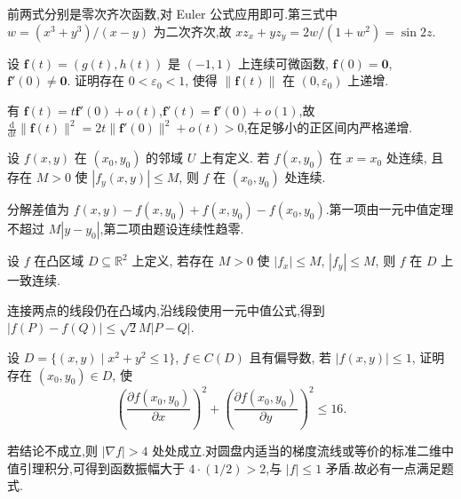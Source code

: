 \begin{solution}
    前两式分别是零次齐次函数,对 Euler 公式应用即可.第三式中 $w=(x^3+y^3)/(x-y)$ 为二次齐次,故 $xz_x+yz_y=2w/(1+w^2)=\sin2z$.
\end{solution}

\begin{example}
    设 $\bm f(t)=(g(t),h(t))$ 是 $(-1,1)$ 上连续可微函数, $\bm f(0)=\bm{0}$, $\bm f'(0)\ne\bm{0}$. 证明存在 $0<\varepsilon_0<1$, 使得 $\|\bm f(t)\|$ 在 $(0,\varepsilon_0)$ 上递增.
\end{example}
\exampleblank

\begin{solution}
    有 $\bm f(t)=t\bm f'(0)+o(t)$,$\bm f'(t)=\bm f'(0)+o(1)$,故
    $\frac{\mathrm d}{\mathrm dt}\|\bm f(t)\|^2=2t\|\bm f'(0)\|^2+o(t)>0$,在足够小的正区间内严格递增.
\end{solution}

\begin{example}
    设 $f(x,y)$ 在 $(x_0,y_0)$ 的邻域 $U$ 上有定义. 若 $f(x,y_0)$ 在 $x=x_0$ 处连续, 且存在 $M>0$ 使 $|f_y(x,y)|\leq M$, 则 $f$ 在 $(x_0,y_0)$ 处连续.
\end{example}
\exampleblank

\begin{solution}
    分解差值为 $f(x,y)-f(x,y_0)+f(x,y_0)-f(x_0,y_0)$.第一项由一元中值定理不超过 $M|y-y_0|$,第二项由题设连续性趋零.
\end{solution}

\begin{example}
    设 $f$ 在凸区域 $D\subseteq\mathbb{R}^2$ 上定义, 若存在 $M>0$ 使 $|f_x|\leq M$, $|f_y|\leq M$, 则 $f$ 在 $D$ 上一致连续.
\end{example}
\exampleblank

\begin{solution}
    连接两点的线段仍在凸域内,沿线段使用一元中值公式,得到 $|f(P)-f(Q)|\leq\sqrt{2}M|P-Q|$.
\end{solution}

\begin{example}
    设 $D=\{(x,y)\mid x^2+y^2\leq1\}$, $f\in C(D)$ 且有偏导数, 若 $|f(x,y)|\leq1$, 证明存在 $(x_0,y_0)\in D$, 使
    \[
        \left(\dfrac{\partial f(x_0,y_0)}{\partial x}\right)^2
        +\left(\dfrac{\partial f(x_0,y_0)}{\partial y}\right)^2\leq16.
    \]
\end{example}
\exampleblank

\begin{solution}
    若结论不成立,则 $|\nabla f|>4$ 处处成立.对圆盘内适当的梯度流线或等价的标准二维中值引理积分,可得到函数振幅大于 $4\cdot(1/2)>2$,与 $|f|\leq1$ 矛盾.故必有一点满足题式.
\end{solution}

